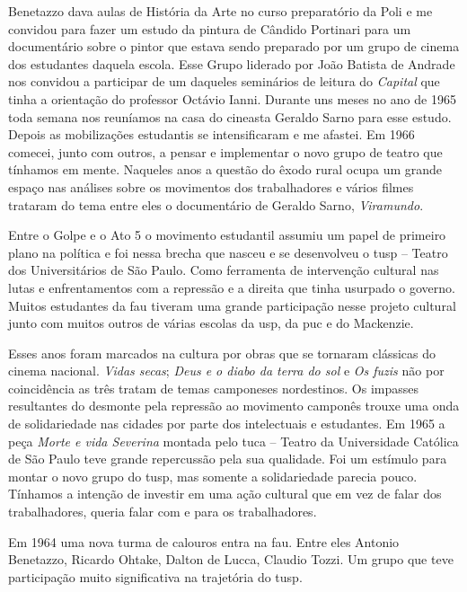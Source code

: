 Benetazzo dava aulas de História da Arte no curso preparatório da Poli e
me convidou para fazer um estudo da pintura de Cândido Portinari para um
documentário sobre o pintor que estava sendo preparado por um grupo de
cinema dos estudantes daquela escola. Esse Grupo liderado por João
Batista de Andrade nos convidou a participar de um daqueles seminários
de leitura do {\it Capital} que tinha a orientação do professor Octávio
Ianni. Durante uns meses no ano de 1965 toda semana nos reuníamos na
casa do cineasta Geraldo Sarno para esse estudo. Depois as mobilizações
estudantis se intensificaram e me afastei. Em 1966 comecei, junto com
outros, a pensar e implementar o novo grupo de teatro que tínhamos em
mente. Naqueles anos a questão do êxodo rural ocupa um grande espaço nas
análises sobre os movimentos dos trabalhadores e vários filmes trataram
do tema entre eles o documentário de Geraldo Sarno, {\it Viramundo}.

Entre o Golpe e o Ato 5 o movimento estudantil assumiu um papel de
primeiro plano na política e foi nessa brecha que nasceu e se
desenvolveu o {\sc tusp} -- Teatro dos Universitários de São Paulo. Como
ferramenta de intervenção cultural nas lutas e enfrentamentos com a
repressão e a direita que tinha usurpado o governo. Muitos estudantes da
{\sc fau} tiveram uma grande participação nesse projeto cultural junto com
muitos outros de várias escolas da {\sc usp}, da {\sc puc} e do Mackenzie.

\subject{O {\cap tusp}}

Esses anos foram marcados na cultura por obras que se tornaram clássicas
do cinema nacional. {\it Vidas secas}; {\it Deus e o diabo da terra do
sol} e {\it Os fuzis} não por coincidência as três tratam de temas
camponeses nordestinos. Os impasses resultantes do desmonte pela
repressão ao movimento camponês trouxe uma onda de solidariedade nas
cidades por parte dos intelectuais e estudantes. Em 1965 a peça
{\it Morte e vida Severina} montada pelo {\sc tuca} -- Teatro da Universidade
Católica de São Paulo teve grande repercussão pela sua qualidade. Foi um
estímulo para montar o novo grupo do {\sc tusp}, mas somente a solidariedade
parecia pouco. Tínhamos a intenção de investir em uma ação cultural que
em vez de falar dos trabalhadores, queria falar com e para os
trabalhadores.

Em 1964 uma nova turma de calouros entra na {\sc fau}. Entre eles Antonio
Benetazzo, Ricardo Ohtake, Dalton de Lucca, Claudio Tozzi. Um grupo que
teve participação muito significativa na trajetória do {\sc tusp}.

